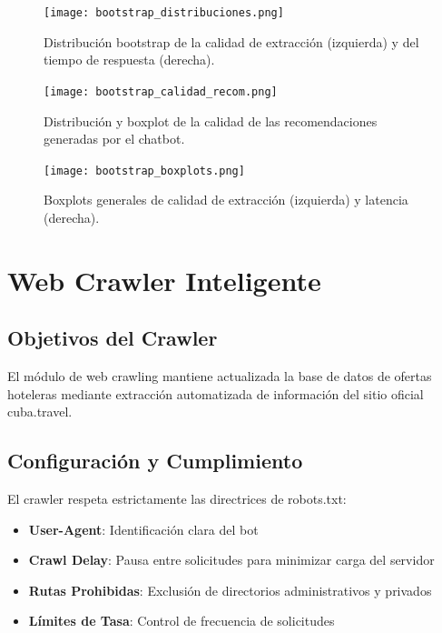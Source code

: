 \documentclass[runningheads]{llncs}
\begin{document}
\begin{figure}[H]
    \centering
    \texttt{[image: bootstrap\_distribuciones.png]}
    \caption{Distribución bootstrap de la calidad de extracción (izquierda) y del tiempo de respuesta (derecha).}
    \label{fig:bootstrap_qual_time}
\end{figure}

\begin{figure}[H]
    \centering
    \texttt{[image: bootstrap\_calidad\_recom.png]}
    \caption{Distribución y boxplot de la calidad de las recomendaciones generadas por el chatbot.}
    \label{fig:bootstrap_recom}
\end{figure}

\begin{figure}[H]
    \centering
    \texttt{[image: bootstrap\_boxplots.png]}
    \caption{Boxplots generales de calidad de extracción (izquierda) y latencia (derecha).}
    \label{fig:boxplots_resumen}
\end{figure}

\section{Web Crawler Inteligente}

\subsection{Objetivos del Crawler}

El módulo de web crawling mantiene actualizada la base de datos de ofertas hoteleras mediante extracción automatizada de información del sitio oficial cuba.travel.

\subsection{Configuración y Cumplimiento}

El crawler respeta estrictamente las directrices de robots.txt:

\begin{itemize}
\item \textbf{User-Agent}: Identificación clara del bot
\item \textbf{Crawl Delay}: Pausa entre solicitudes para minimizar carga del servidor
\item \textbf{Rutas Prohibidas}: Exclusión de directorios administrativos y privados
\item \textbf{Límites de Tasa}: Control de frecuencia de solicitudes
\end{itemize}
\end{document}
